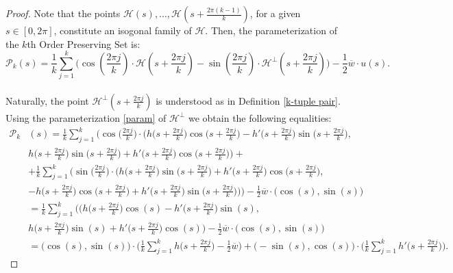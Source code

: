 \documentclass[10pt,a4paper]{amsart}
\begin{document}
\begin{proof}
 Note that the points $\mathcal{H}(s),\ldots,\mathcal{H}\left(s+\frac{2\pi(k-1)}{k}\right)$, for a given $s\in[0,2\pi]$, constitute an isogonal family of $\mathcal{H}$. Then, the parameterization of the $k$th Order Preserving Set is:
    $$\mathcal{P}_k(s) =\frac{1}{k}\sum_{j=1}^{k}\Bigg(\cos\left(\frac{2\pi j}{k}\right)\cdot \mathcal{H}\left(s+\frac{2\pi j}{k}\right)-\sin\left(\frac{2\pi j}{k}\right)\cdot \mathcal{H}^\perp\left(s+\frac{2\pi j}{k}\right)\Bigg) -\frac{1}{2}\overline{w}\cdot u(s).$$\\Naturally, the point $\mathcal{H}^\perp(s+\frac{2\pi j}{k})$ is understood as in Definition \ref{k-tuple pair}. Using the parameterization \eqref{param} of $\mathcal{H}^\perp$ we obtain the following equalities:
    {\footnotesize
    \begin{align*}    
    \mathcal{P}_k&(s) = \frac{1}{k}\sum_{j=1}^{k}\Bigg(\cos\Big(\frac{2\pi j}{k}\Big)\cdot \Bigg( h\Big(s+\frac{2\pi j}{k}\Big)\cos\Big(s+\frac{2\pi j}{k}\Big) - h'\Big(s+\frac{2\pi j}{k}\Big) \sin\Big(s+\frac{2\pi j}{k}\Big),\\&  h\Big(s+\frac{2\pi j}{k}\Big) \sin\Big(s+\frac{2\pi j}{k}\Big) + h'\Big(s+\frac{2\pi j}{k}\Big) \cos\Big(s+\frac{2\pi j}{k}\Big) \Bigg)+\\&+\frac{1}{k}\sum_{j=1}^{k}\Bigg(\sin\Big(\frac{2\pi j}{k}\Big)\cdot \Bigg( h\Big(s+\frac{2\pi j}{k}\Big) \sin\Big(s+\frac{2\pi j}{k}\Big) + h'\Big(s+\frac{2\pi j}{k}\Big) \cos\Big(s+\frac{2\pi j}{k}\Big),\\&   -h\Big(s+\frac{2\pi j}{k}\Big) \cos\Big(s+\frac{2\pi j}{k}\Big) + h'\Big(s+\frac{2\pi j}{k}\Big) \sin\Big(s+\frac{2\pi j}{k}\Big) \Bigg)\Bigg)-\frac{1}{2}\overline{w}\cdot \big(\cos(s),\sin(s)\big)\\&=\frac{1}{k}\sum_{j=1}^{k}\Bigg( \Bigg( h\Big(s+\frac{2\pi j}{k}\Big)\cos(s) - h'\Big(s+\frac{2\pi j}{k}\Big) \sin(s),\\&  h\Big(s+\frac{2\pi j}{k}\Big) \sin(s) + h'\Big(s+\frac{2\pi j}{k}\Big) \cos(s) \Bigg)-\frac{1}{2}\overline{w}\cdot \big(\cos(s),\sin(s)\big)\\&= \Big(\cos(s),\sin(s)\Big)\cdot \Bigg(\frac{1}{k}\sum_{j=1}^{k} h\Big(s+\frac{2\pi j}{k}\Big)-\frac{1}{2}\overline{w}\Bigg) + \Big(-\sin(s),\cos(s)\Big)\cdot \Bigg(\frac{1}{k}\sum_{j=1}^{k} h'\Big(s+\frac{2\pi j}{k}\Big)\Bigg).
    \end{align*}}



\end{proof}
\end{document}
